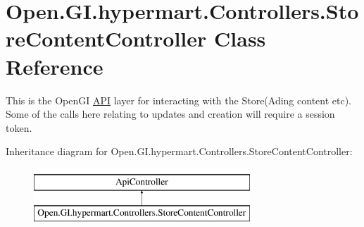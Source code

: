 \hypertarget{class_open_1_1_g_i_1_1hypermart_1_1_controllers_1_1_store_content_controller}{}\section{Open.\+G\+I.\+hypermart.\+Controllers.\+Store\+Content\+Controller Class Reference}
\label{class_open_1_1_g_i_1_1hypermart_1_1_controllers_1_1_store_content_controller}


This is the Open\+GI \hyperlink{namespace_open_1_1_g_i_1_1hypermart_1_1_controllers_1_1_a_p_i}{A\+PI} layer for interacting with the Store(\+Ading content etc). Some of the calls here relating to updates and creation will require a session token.  


Inheritance diagram for Open.\+G\+I.\+hypermart.\+Controllers.\+Store\+Content\+Controller\+:\begin{figure}[H]
\begin{center}
\leavevmode
\includegraphics[height=2.000000cm]{class_open_1_1_g_i_1_1hypermart_1_1_controllers_1_1_store_content_controller}
\end{center}
\end{figure}
